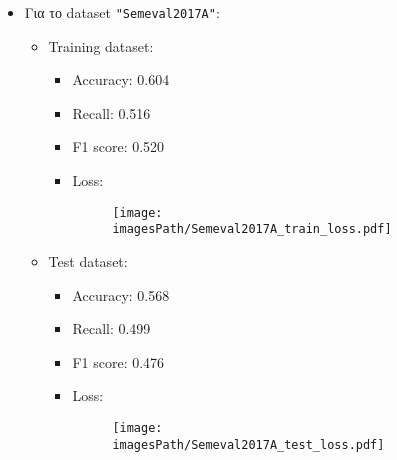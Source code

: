 \documentclass[a4paper, 12pt]{article}
\newcommand{\imagesPath}{results}
\newcommand{\myWidth}{0.8\linewidth}
\begin{document}
\begin{itemize}
                \item Για το dataset \verb|"Semeval2017A"|:
                    \begin{itemize}
                        \item Training dataset:
                            \begin{itemize}
                                \item Accuracy: 0.604
                                \item Recall: 0.516
                                \item F1 score: 0.520
                                \item Loss:
                                    \begin{figure}[H]
                                        \centering
                                        \texttt{[image: \\imagesPath/Semeval2017A\_train\_loss.pdf]}
                                    \end{figure}
                            \end{itemize}
                            
                        \item Test dataset:
                            \begin{itemize}
                                \item Accuracy: 0.568
                                \item Recall: 0.499
                                \item F1 score: 0.476
                                \item Loss:
                                    \begin{figure}[H]
                                        \centering
                                        \texttt{[image: \\imagesPath/Semeval2017A\_test\_loss.pdf]}
                                    \end{figure}
                            \end{itemize}
                    \end{itemize}
            \end{itemize}
            
\end{document}
